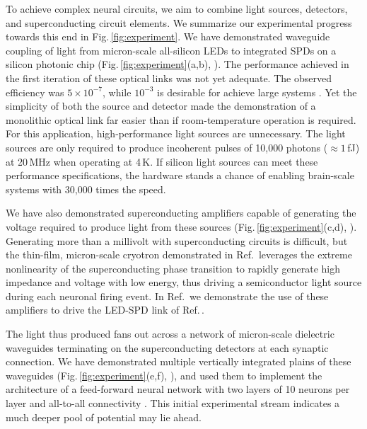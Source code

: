 \documentclass[twocolumn]{article}
\begin{document}
To achieve complex neural circuits, we aim to combine light sources, detectors, and superconducting circuit elements. We summarize our experimental progress towards this end in Fig.\,\ref{fig:experiment}. We have demonstrated waveguide coupling of light from micron-scale all-silicon LEDs to integrated SPDs on a silicon photonic chip (Fig.\,\ref{fig:experiment}(a,b), \cite{buch2017}). The performance achieved in the first iteration of these optical links was not yet adequate. The observed efficiency was $5\times10^{-7}$, while $10^{-3}$ is desirable for achieve large systems \cite{sh2018_full}. Yet the simplicity of both the source and detector made the demonstration of a monolithic optical link far easier than if room-temperature operation is required. For this application, high-performance light sources are unnecessary. The light sources are only required to produce incoherent pulses of 10,000 photons ($\approx 1$\,fJ) at 20\,MHz when operating at 4\,K. If silicon light sources can meet these performance specifications, the hardware stands a chance of enabling brain-scale systems with 30,000 times the speed.

We have also demonstrated superconducting amplifiers capable of generating the voltage required to produce light from these sources (Fig.\,\ref{fig:experiment}(c,d), \cite{mc2019}). Generating more than a millivolt with superconducting circuits is difficult, but the thin-film, micron-scale cryotron demonstrated in Ref.\,\cite{mc2019} leverages the extreme nonlinearity of the superconducting phase transition to rapidly generate high impedance and voltage with low energy, thus driving a semiconductor light source during each neuronal firing event. In Ref.\,\cite{mc2019} we demonstrate the use of these amplifiers to drive the LED-SPD link of Ref.\,\cite{buch2017}.

The light thus produced fans out across a network of micron-scale dielectric waveguides terminating on the superconducting detectors at each synaptic connection. We have demonstrated multiple vertically integrated plains of these waveguides (Fig.\,\ref{fig:experiment}(e,f), \cite{chbu2017}), and used them to implement the architecture of a feed-forward neural network with two layers of 10 neurons per layer and all-to-all connectivity \cite{chbu2018}. This initial experimental stream indicates a much deeper pool of potential may lie ahead.  
\end{document}
